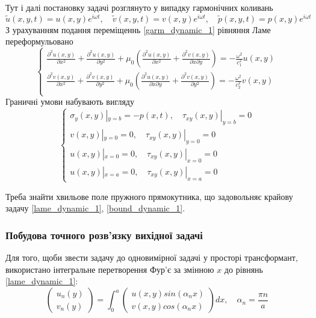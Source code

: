 Тут і далі постановку задачі розглянуто у випадку гармонічних коливань
\begin{equation}\label{garm_dynamic_1}
    \widetilde{u}(x,y,t) = u(x,y) e^{i \omega t}, \quad  \widetilde{v}(x,y,t) = v(x,y) e^{i \omega t}, \quad \widetilde{p}(x, y, t) = p(x, y) e^{i \omega t}
\end{equation}
З урахуванням подання переміщеннь \eqref{garm_dynamic_1} рівняння Ламе переформульовано
\begin{equation}\label{lame_dynamic_1}
    \begin{cases}
        \frac{\partial^2 u(x,y)}{\partial x^2} + \frac{\partial^2 u(x,y)}{\partial y^2} + \mu_0 (\frac{\partial^2 u(x,y)}{\partial x^2} + \frac{\partial^2 v(x,y)}{\partial x\partial y}) = -\frac{\omega^2}{c_1^2}  u(x,y) \\
        \frac{\partial^2 v(x,y)}{\partial x^2} + \frac{\partial^2 v(x,y)}{\partial y^2} + \mu_0 (\frac{\partial^2 u(x,y)}{\partial x \partial y} + \frac{\partial^2 v(x,y)}{\partial y^2}) = -\frac{\omega^2}{c_2^2} v(x,y) \\
    \end{cases}
\end{equation}
Граничні умови набувають вигляду
\begin{equation}\label{bound_dynamic_1}
    \begin{cases}
        \sigma_y(x, y) |_{y=b} = -p(x, t), \quad  \tau_{xy}(x,y) |_{y=b} = 0 \\
        v(x,y) |_{y=0} = 0, \quad \tau_{xy}(x,y) |_{y=0} = 0 \\
        u(x,y) |_{x=0} = 0, \quad \tau_{xy}(x,y) |_{x=0} = 0 \\
        u(x,y) |_{x=a} = 0, \quad \tau_{xy}(x,y) |_{x=a} = 0 
    \end{cases}
\end{equation}

Треба знайти хвильове поле пружного прямокутника,
що задовольняє крайову задачу \eqref{lame_dynamic_1}, \eqref{bound_dynamic_1}.

\subsubsection{Побудова точного розв'язку вихідної задачі}
Для того, щоби звести задачу до одновимірної задачі у просторі трансформант, використано інтегральне перетворення Фур'є за змінною $x$ до рівнянь \eqref{lame_dynamic_1}:
\begin{equation}\label{int_trans_dynamic_1}
    \begin{pmatrix}
        u_n(y) \\
        v_n(y)
    \end{pmatrix} = \int_{0}^{a} 
    \begin{pmatrix}
        u(x,y) sin(\alpha_n x) \\
        v(x,y) cos(\alpha_n x)
    \end{pmatrix} dx, \quad \alpha_n = \frac{\pi n}{a}
\end{equation}

